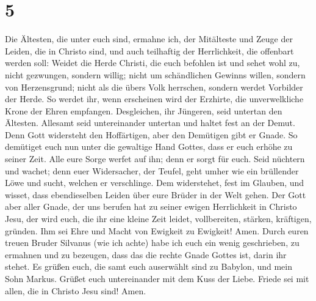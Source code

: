 \hypertarget{section-4}{%
\section{5}\label{section-4}}

 Die Ältesten, die unter euch sind, ermahne ich, der
Mitälteste und Zeuge der Leiden, die in Christo sind, und auch
teilhaftig der Herrlichkeit, die offenbart werden soll: 
Weidet die Herde Christi, die euch befohlen ist und sehet wohl zu, nicht
gezwungen, sondern willig; nicht um schändlichen Gewinns willen, sondern
von Herzensgrund;  nicht als die übers Volk herrschen,
sondern werdet Vorbilder der Herde.  So werdet ihr, wenn
erscheinen wird der Erzhirte, die unverwelkliche Krone der Ehren
empfangen.  Desgleichen, ihr Jüngeren, seid untertan den
Ältesten. Allesamt seid untereinander untertan und haltet fest an der
Demut. Denn Gott widersteht den Hoffärtigen, aber den Demütigen gibt er
Gnade.  So demütiget euch nun unter die gewaltige Hand
Gottes, dass er euch erhöhe zu seiner Zeit.  Alle eure
Sorge werfet auf ihn; denn er sorgt für euch.  Seid
nüchtern und wachet; denn euer Widersacher, der Teufel, geht umher wie
ein brüllender Löwe und sucht, welchen er verschlinge. 
Dem widerstehet, fest im Glauben, und wisset, dass ebendieselben Leiden
über eure Brüder in der Welt gehen.  Der Gott aber aller
Gnade, der uns berufen hat zu seiner ewigen Herrlichkeit in Christo
Jesu, der wird euch, die ihr eine kleine Zeit leidet, vollbereiten,
stärken, kräftigen, gründen.  Ihm sei Ehre und Macht von
Ewigkeit zu Ewigkeit! Amen.  Durch euren treuen Bruder
Silvanus (wie ich achte) habe ich euch ein wenig geschrieben, zu
ermahnen und zu bezeugen, dass das die rechte Gnade Gottes ist, darin
ihr stehet.  Es grüßen euch, die samt euch auserwählt
sind zu Babylon, und mein Sohn Markus.  Grüßet euch
untereinander mit dem Kuss der Liebe. Friede sei mit allen, die in
Christo Jesu sind! Amen.

